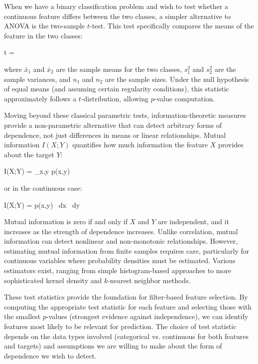 When we have a binary classification problem and wish to test whether a continuous feature differs between the two classes, a simpler alternative to ANOVA is the two-sample $t$-test. This test specifically compares the means of the feature in the two classes:
\begin{myequation}
t = 
\end{myequation}
where $\bar{x}_1$ and $\bar{x}_2$ are the sample means for the two classes, $s_1^2$ and $s_2^2$ are the sample variances, and $n_1$ and $n_2$ are the sample sizes. Under the null hypothesis of equal means (and assuming certain regularity conditions), this statistic approximately follows a $t$-distribution, allowing $p$-value computation.

Moving beyond these classical parametric tests, information-theoretic measures provide a non-parametric alternative that can detect arbitrary forms of dependence, not just differences in means or linear relationships. Mutual information $I(X;Y)$ quantifies how much information the feature $X$ provides about the target $Y$:
\begin{myequation}
I(X;Y) = \sum_{x,y} p(x,y) \log {}
\end{myequation}
or in the continuous case:
\begin{myequation}
I(X;Y) = \int \int p(x,y) \log {} \, dx \, dy
\end{myequation}

Mutual information is zero if and only if $X$ and $Y$ are independent, and it increases as the strength of dependence increases. Unlike correlation, mutual information can detect nonlinear and non-monotonic relationships. However, estimating mutual information from finite samples requires care, particularly for continuous variables where probability densities must be estimated. Various estimators exist, ranging from simple histogram-based approaches to more sophisticated kernel density and $k$-nearest neighbor methods.

These test statistics provide the foundation for filter-based feature selection. By computing the appropriate test statistic for each feature and selecting those with the smallest $p$-values (strongest evidence against independence), we can identify features most likely to be relevant for prediction. The choice of test statistic depends on the data types involved (categorical vs. continuous for both features and targets) and assumptions we are willing to make about the form of dependence we wish to detect.

